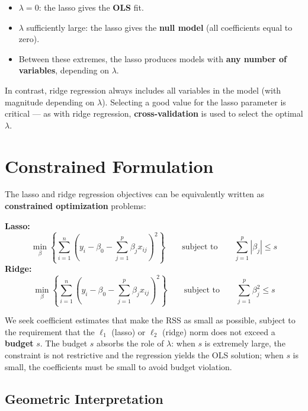 \documentclass[11pt,a4paper]{article}
\theoremstyle{definition}
\theoremstyle{plain}
\theoremstyle{remark}
\begin{document}
\begin{itemize}
    \item $\lambda = 0$: the lasso gives the \textbf{OLS} fit.
    \item $\lambda$ sufficiently large: the lasso gives the \textbf{null model} (all coefficients equal to zero).
    \item Between these extremes, the lasso produces models with \textbf{any number of variables}, depending on $\lambda$.
\end{itemize}

In contrast, ridge regression always includes all variables in the model (with magnitude depending on $\lambda$). Selecting a good value for the lasso parameter is critical --- as with ridge regression, \textbf{cross-validation} is used to select the optimal $\lambda$.

\section{Constrained Formulation}

The lasso and ridge regression objectives can be equivalently written as \textbf{constrained optimization} problems:

\begin{tcolorbox}[colback=blue!5!white,colframe=blue!75!black,title=\textbf{Constrained Formulations}]
\textbf{Lasso:}
\[
    \min_\beta \left\{\sum_{i=1}^{n} \left(y_i - \beta_0 - \sum_{j=1}^{p} \beta_j x_{ij}\right)^{\!2}\right\}
    \qquad \text{subject to} \qquad
    \sum_{j=1}^{p} |\beta_j| \leq s
\]
\textbf{Ridge:}
\[
    \min_\beta \left\{\sum_{i=1}^{n} \left(y_i - \beta_0 - \sum_{j=1}^{p} \beta_j x_{ij}\right)^{\!2}\right\}
    \qquad \text{subject to} \qquad
    \sum_{j=1}^{p} \beta_j^2 \leq s
\]
\end{tcolorbox}

We seek coefficient estimates that make the RSS as small as possible, subject to the requirement that the $\ell_1$ (lasso) or $\ell_2$ (ridge) norm does not exceed a \textbf{budget} $s$. The budget $s$ absorbs the role of $\lambda$: when $s$ is extremely large, the constraint is not restrictive and the regression yields the OLS solution; when $s$ is small, the coefficients must be small to avoid budget violation.

\subsection{Geometric Interpretation}
\end{document}
